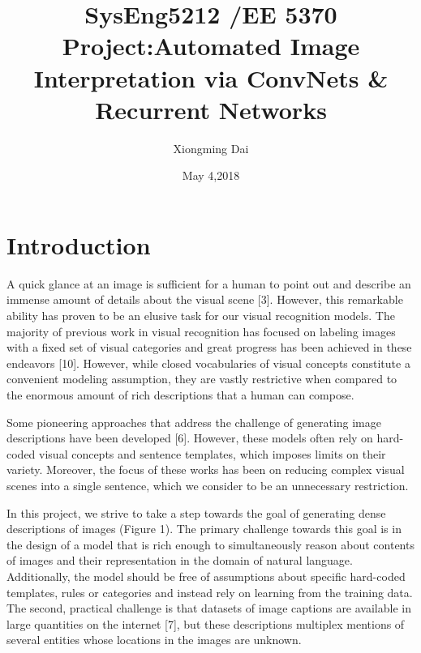 \documentclass[12pt]{article}%
\begin{document}
\title{SysEng5212 /EE 5370 Project:Automated Image Interpretation via ConvNets \& Recurrent Networks}
\author{Xiongming Dai}
\date{May 4,2018}
\maketitle


\section{Introduction}

A quick glance at an image is sufficient for a human to point out and describe an immense amount of details about the visual scene [3]. However, this remarkable ability has proven to be an elusive task for our visual recognition models. The majority of previous work in visual recognition has focused on labeling images with a fixed set of visual categories and great progress has been achieved in these endeavors [10]. However, while closed vocabularies of visual concepts constitute a convenient modeling assumption, they are vastly restrictive when compared to the enormous amount of rich descriptions that a human can compose.

Some pioneering approaches that address the challenge of generating image descriptions have been developed [6]. However, these models often rely on hard-coded visual concepts and sentence templates, which imposes limits on their variety. Moreover, the focus of these works has been on reducing complex visual scenes into a single sentence, which we consider to be an unnecessary restriction.

In this project, we strive to take a step towards the goal of generating dense descriptions of images (Figure 1). The primary challenge towards this goal is in the design of a model that is rich enough to simultaneously reason about contents of images and their representation in the domain of natural language. Additionally, the model should be free of assumptions about specific hard-coded templates, rules or categories and instead rely on learning from the training data. The second, practical challenge is that datasets of image captions are available in large quantities on the internet [7], but these descriptions multiplex mentions of several entities whose locations in the images are unknown.
\end{document}
